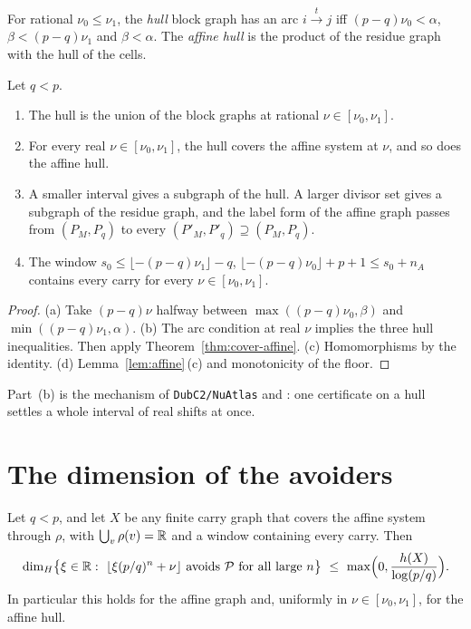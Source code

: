 \begin{definition}\label{def:hull}
For rational \(\nu_0\le\nu_1\), the \emph{hull} block graph has an arc \(i\xrightarrow{t}j\) iff
\((p-q)\nu_0<\alpha\), \(\beta<(p-q)\nu_1\) and \(\beta<\alpha\). The \emph{affine hull} is the
product of the residue graph with the hull of the cells.
\end{definition}

\begin{theorem}\label{thm:hull}
Let \(q<p\).
\begin{enumerate}[label=(\alph*)]
\item The hull is the union of the block graphs at rational \(\nu\in[\nu_0,\nu_1]\).
\item For every real \(\nu\in[\nu_0,\nu_1]\), the hull covers the affine system at \(\nu\), and
  so does the affine hull.
\item A smaller interval gives a subgraph of the hull. A larger divisor set gives a subgraph of
  the residue graph, and the label form of the affine graph passes from \((P_M,P_q)\) to every
  \((P'_M,P'_q)\supseteq(P_M,P_q)\).
\item The window \(s_0\le\lfloor-(p-q)\nu_1\rfloor-q\),
  \(\lfloor-(p-q)\nu_0\rfloor+p+1\le s_0+n_A\) contains every carry for every
  \(\nu\in[\nu_0,\nu_1]\).
\end{enumerate}
\end{theorem}

\begin{proof}
(a) Take \((p-q)\nu\) halfway between \(\max((p-q)\nu_0,\beta)\) and
\(\min((p-q)\nu_1,\alpha)\). (b) The arc condition at real \(\nu\) implies the three hull
inequalities. Then apply Theorem~\ref{thm:cover-affine}. (c) Homomorphisms by the identity.
(d) Lemma~\ref{lem:affine}\,(c) and monotonicity of the floor.
\end{proof}

Part~(b) is the mechanism of \texttt{DubC2/NuAtlas} and : one
certificate on a hull settles a whole interval of real shifts at once.

\section{The dimension of the avoiders}

\begin{theorem}\label{thm:dim-avoiders}
Let \(q<p\), and let \(X\) be any finite carry graph that covers the affine system through
\(\rho\), with \(\bigcup_v\rho(v)=\mathbb{R}\) and a window containing every carry. Then
\[
\dim_H\bigl\{\xi\in\R:\ \lfloor\xi(p/q)^n+\nu\rfloor\text{ avoids }\mathcal P\text{ for all
large }n\bigr\}\ \le\ \max\Bigl(0,\frac{h(X)}{\log(p/q)}\Bigr).
\]
In particular this holds for the affine graph and, uniformly in \(\nu\in[\nu_0,\nu_1]\), for the
affine hull.
\end{theorem}

